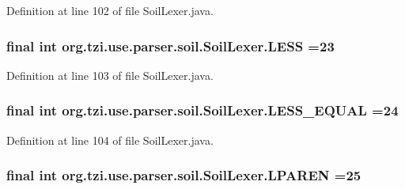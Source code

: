 Definition at line 102 of file Soil\-Lexer.\-java.

\hypertarget{classorg_1_1tzi_1_1use_1_1parser_1_1soil_1_1_soil_lexer_aa7d9a7d02c5441d52738a14dba764e04}{
\subsubsection[{L\-E\-S\-S}]{\setlength{\rightskip}{0pt plus 5cm}final int org.\-tzi.\-use.\-parser.\-soil.\-Soil\-Lexer.\-L\-E\-S\-S =23\hspace{0.3cm}{\ttfamily [static]}}}\label{classorg_1_1tzi_1_1use_1_1parser_1_1soil_1_1_soil_lexer_aa7d9a7d02c5441d52738a14dba764e04}


Definition at line 103 of file Soil\-Lexer.\-java.

\hypertarget{classorg_1_1tzi_1_1use_1_1parser_1_1soil_1_1_soil_lexer_a3481a95349c2df3edb578dd0dea4a7d4}{
\subsubsection[{L\-E\-S\-S\-\_\-\-E\-Q\-U\-A\-L}]{\setlength{\rightskip}{0pt plus 5cm}final int org.\-tzi.\-use.\-parser.\-soil.\-Soil\-Lexer.\-L\-E\-S\-S\-\_\-\-E\-Q\-U\-A\-L =24\hspace{0.3cm}{\ttfamily [static]}}}\label{classorg_1_1tzi_1_1use_1_1parser_1_1soil_1_1_soil_lexer_a3481a95349c2df3edb578dd0dea4a7d4}


Definition at line 104 of file Soil\-Lexer.\-java.

\hypertarget{classorg_1_1tzi_1_1use_1_1parser_1_1soil_1_1_soil_lexer_a535566acd69b10a3b8cd822b5505d756}{
\subsubsection[{L\-P\-A\-R\-E\-N}]{\setlength{\rightskip}{0pt plus 5cm}final int org.\-tzi.\-use.\-parser.\-soil.\-Soil\-Lexer.\-L\-P\-A\-R\-E\-N =25\hspace{0.3cm}{\ttfamily [static]}}}\label{classorg_1_1tzi_1_1use_1_1parser_1_1soil_1_1_soil_lexer_a535566acd69b10a3b8cd822b5505d756}



